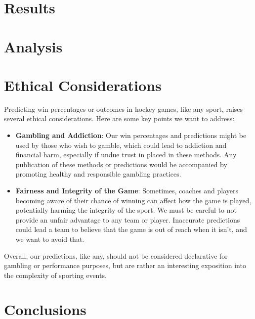 \documentclass[11pt]{article}
\begin{document}
\section{Results}

\section{Analysis}

\section{Ethical Considerations}
Predicting win percentages or outcomes in hockey games, like any sport, raises several ethical considerations. Here are some key points we want to address:

\begin{itemize}[label=\textbullet]
\item \textbf{Gambling and Addiction}:
Our win percentages and predictions might be used by those who wish to gamble, which could lead to addiction and financial harm, especially if undue trust in placed in these methods. Any publication of these methods or predictions would be accompanied by promoting healthy and responsible gambling practices.
    
\item \textbf{Fairness and Integrity of the Game}:
Sometimes, coaches and players becoming aware of their chance of winning can affect how the game is played, potentially harming the integrity of the sport. We must be careful to not provide an unfair advantage to any team or player.
Inaccurate predictions could lead a team to believe that the game is out of reach when it isn't, and we want to avoid that.
            
\end{itemize}

Overall, our predictions, like any, should not be considered declarative for gambling or performance purposes, but are rather an interesting exposition into the complexity of sporting events.


\section{Conclusions}


\end{document}
